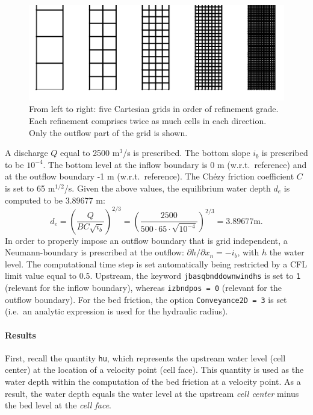 \begin{figure}[h!]
\begin{center}
\includegraphics[width=0.8\columnwidth]{figures/grids.png}
\end{center}\caption{From left to right: five Cartesian grids in order of refinement grade. Each refinement comprises twice as much cells in each direction. Only the outflow part of the grid is shown. \label{fig:chezysquaresgrids}}
\end{figure}

A discharge $Q$ equal to 2500 m$^3$/s is prescribed. The bottom slope $i_b$ is prescribed to be $10^{-4}$. The bottom level at the inflow boundary is 0 m (w.r.t.\ reference) and at the outflow boundary -1 m (w.r.t.\ reference). The Ch\'ezy friction coefficient $C$ is set to 65 m$^{1/2}$/s. Given the above values, the equilibrium water depth $d_e$ is computed to be 3.89677 m:
\begin{equation}
d_{e} = \left(\frac{Q}{B C \sqrt{i_b}}\right)^{2/3} = \left(\frac{2500}{500 \cdot 65 \cdot \sqrt{10^{-4}}}\right)^{2/3}  = 3.89677\textrm{m}.
\end{equation}
In order to properly impose an outflow boundary that is grid independent, a Neumann-boundary is prescribed at the outflow: $\partial h / \partial x_n = -i_b$, with $h$ the water level. The computational time step is set automatically being restricted by a CFL limit value equal to 0.5. Upstream, the keyword \texttt{jbasqbnddownwindhs} is set to \texttt{1} (relevant for the inflow boundary), whereas \texttt{izbndpos = 0} (relevant for the outflow boundary). For the bed friction, the option \texttt{Conveyance2D = 3} is set (i.e.\ an analytic expression is used for the hydraulic radius).



\paragraph*{Results}
First, recall the quantity \texttt{hu}, which represents the upstream water level (cell center) at the location of a velocity point (cell face). This quantity is used as the water depth within the computation of the bed friction at a velocity point. As a result, the water depth equals the water level at the upstream \emph{cell center} minus the bed level at the \emph{cell face}.

